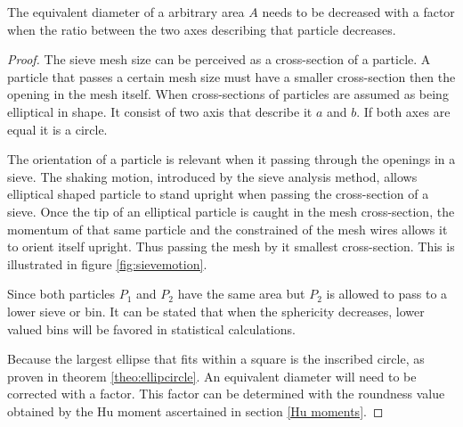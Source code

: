 \documentclass[11pt,fleqn,,a4paper,twoside,openright]{book}
\begin{document}
\begin{theorem}\label{theo:CorrBetweensphereandpart}
	The equivalent diameter of a arbitrary area $ A $ needs to be decreased with a factor when the ratio between the two axes describing that particle decreases.

	\begin{proof}
			The sieve mesh size can be perceived as a cross-section of a particle. A particle that passes a certain mesh size must have a smaller cross-section then the opening in the mesh itself. When cross-sections of particles are assumed as being elliptical in shape. It consist of two axis that describe it $ a $ and $ b $. If both axes are equal it is a circle.

			The orientation of a particle is relevant when it passing through the openings in a sieve. The shaking motion, introduced by the sieve analysis method, allows elliptical shaped particle to stand upright when passing the cross-section of a sieve. Once the tip of an elliptical particle is caught in the mesh cross-section, the momentum of that same particle and the constrained of the mesh wires allows it to orient itself upright. Thus passing the mesh by it smallest cross-section. This is illustrated in figure \ref{fig:sievemotion}.

			Since both particles $ P_1 $ and $ P_2 $ have the same area but $ P_2 $ is allowed to pass to a lower sieve or bin. It can be stated that when the sphericity decreases, lower valued bins will be favored in statistical calculations.

			Because the largest ellipse that fits within a square is the inscribed circle, as proven in theorem \ref{theo:ellipcircle}. An equivalent diameter will need to be corrected with a factor. This factor can be determined with the roundness value obtained by the Hu moment ascertained in section \ref{Hu moments}.
	\end{proof}

\end{theorem}
\end{document}
